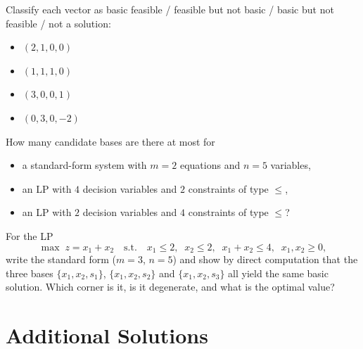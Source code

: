 \begin{problems}
        Classify each vector as basic feasible / feasible but not basic /
        basic but not feasible / not a solution:
        \begin{itemize}[leftmargin=1.8em,itemsep=0.2ex]
          \item[(a)] $(2,1,0,0)$
          \item[(b)] $(1,1,1,0)$
          \item[(c)] $(3,0,0,1)$
          \item[(d)] $(0,3,0,-2)$
        \end{itemize}
  \item How many candidate bases are there at most for
        \begin{itemize}[leftmargin=1.8em,itemsep=0.2ex]
          \item[(a)] a standard-form system with $m=2$ equations and
                $n=5$ variables,
          \item[(b)] an LP with $4$ decision variables and $2$ constraints
                of type $\le$,
          \item[(c)] an LP with $2$ decision variables and $4$ constraints
                of type $\le$?
        \end{itemize}
  \item For the LP
        \[
          \max\; z=x_{1}+x_{2}
          \quad\text{s.t.}\quad
          x_{1}\le 2,\;\;
          x_{2}\le 2,\;\;
          x_{1}+x_{2}\le 4,\;\;
          x_{1},x_{2}\ge 0 ,
        \]
        write the standard form ($m=3$, $n=5$) and show by direct
        computation that the three bases $\{x_{1},x_{2},s_{1}\}$,
        $\{x_{1},x_{2},s_{2}\}$ and $\{x_{1},x_{2},s_{3}\}$ all yield the
        same basic solution. Which corner is it, is it degenerate, and
        what is the optimal value?
\end{problems}

\section{Additional Solutions}

